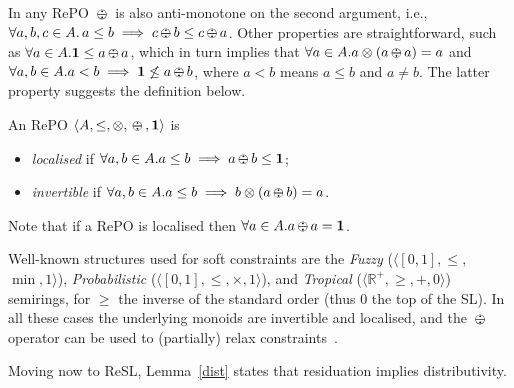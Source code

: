 \documentclass{llncs}
\def\monid{{\mathbf 0}}
\def\monop{\otimes}
\def\odiv{\, {\ominus\hspace{-7.7pt} \div} \,}
\def\monid{\mathbf{1}}
\begin{document}
In any RePO $\odiv$ is also anti-monotone on the second argument, i.e., 
$\forall a, b, c \in A.\, a\leq b \implies  c\odiv b \leq c \odiv a$.
%
Other properties are straightforward, such as 
$\forall a\in A. \monid \leq a \odiv a$, which in turn implies 
that $\forall a\in A. a \monop (a \odiv a) = a$ and
%
%
$\forall a, b \in A. a < b \implies \monid \not \leq a \odiv b$, where
$a < b$ means $a \leq b$ and $a \neq b$.
%
%
%
The latter property suggests the definition below.

\begin{definition}
	An RePO $\langle A, \leq, \monop, \odiv, \monid \rangle$ is
	\begin{itemize}
		\item
		\emph{localised} if $\forall a, b \in A. a \leq b \implies a \odiv b \leq \monid$;
		\item
		\emph{invertible} if $\forall a, b \in A. a \leq b \implies b \monop (a \odiv b) = a$.
	\end{itemize}
\end{definition}

Note that if a RePO is localised then $\forall a \in A. a \odiv a = \monid$.

\begin{remark}\label{rmk:soft}
	Well-known structures used for soft constraints are the 
	\emph{Fuzzy} ($\langle [0,1], \leq,$ $\min, 1 \rangle$), \emph{Probabilistic} ($\langle [0,1], \leq,\allowbreak\times, 1 \rangle$), 
	and \emph{Tropical}   ($\langle \mathbb{R}^+, \geq, +, 0 \rangle$) semirings, for $\geq$ the inverse of the standard order 
	(thus $0$ the top of the SL). In all these cases the underlying monoids 
	are invertible and localised, and
	the $\odiv$ operator can be used to
	(partially) relax constraints~\cite{ecai06}.
\end{remark}

Moving now to ReSL, Lemma~\ref{dist} states that residuation implies distributivity.
\end{document}
